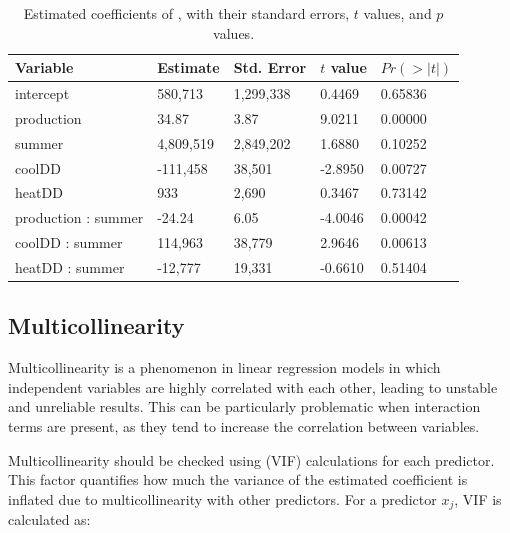 \begin{table}[thbp]
\begin{tabularx}{\textwidth}{@{}lYYYY@{}}
\toprule
\parbox[t]{3.8 cm}{Variable} &
Estimate &
Std. Error &
$t$ value &
$Pr(>|t|)$ \\

\midrule

intercept           &   580,713 & 1,299,338 &  0.4469 & 0.65836 \\
production          &     34.87 &      3.87 &  9.0211 & 0.00000 \\
summer              & 4,809,519 & 2,849,202 &  1.6880 & 0.10252 \\
coolDD              &  -111,458 &    38,501 & -2.8950 & 0.00727 \\
heatDD              &       933 &     2,690 &  0.3467 & 0.73142 \\
production : summer &    -24.24 &      6.05 & -4.0046 & 0.00042 \\
coolDD : summer     &   114,963 &    38,779 &  2.9646 & 0.00613 \\
heatDD : summer     &   -12,777 &    19,331 & -0.6610 & 0.51404 \\

\bottomrule
\end{tabularx}
\caption{Estimated coefficients of , with their standard errors, $t$ values, and $p$ values.}
\label{tab:summary_mod_3}
\end{table}


\subsection{Multicollinearity} %
\label{sub:multicollinearity}

Multicollinearity is a phenomenon in linear regression models in which independent variables are highly correlated with each other, leading to unstable and unreliable results. This can be particularly problematic when interaction terms are present, as they tend to increase the correlation between variables.

Multicollinearity should be checked using  (VIF) calculations for each predictor. This factor quantifies how much the variance of the estimated coefficient is inflated due to multicollinearity with other predictors. For a predictor $x_j$, VIF is calculated as:

